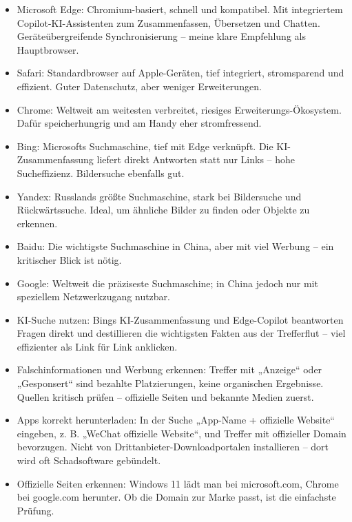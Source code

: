 
\begin{itemize}
  \item Microsoft Edge: Chromium-basiert, schnell und kompatibel. Mit integriertem Copilot-KI-Assistenten zum Zusammenfassen, Übersetzen und Chatten. Geräteübergreifende Synchronisierung – meine klare Empfehlung als Hauptbrowser.
  \item Safari: Standardbrowser auf Apple-Geräten, tief integriert, stromsparend und effizient. Guter Datenschutz, aber weniger Erweiterungen.
  \item Chrome: Weltweit am weitesten verbreitet, riesiges Erweiterungs-Ökosystem. Dafür speicherhungrig und am Handy eher stromfressend.
\end{itemize}


\begin{itemize}
  \item Bing: Microsofts Suchmaschine, tief mit Edge verknüpft. Die KI-Zusammenfassung liefert direkt Antworten statt nur Links – hohe Sucheffizienz. Bildersuche ebenfalls gut.
  \item Yandex: Russlands größte Suchmaschine, stark bei Bildersuche und Rückwärtssuche. Ideal, um ähnliche Bilder zu finden oder Objekte zu erkennen.
  \item Baidu: Die wichtigste Suchmaschine in China, aber mit viel Werbung – ein kritischer Blick ist nötig.
  \item Google: Weltweit die präziseste Suchmaschine; in China jedoch nur mit speziellem Netzwerkzugang nutzbar.
\end{itemize}


\begin{itemize}
  \item KI-Suche nutzen: Bings KI-Zusammenfassung und Edge-Copilot beantworten Fragen direkt und destillieren die wichtigsten Fakten aus der Trefferflut – viel effizienter als Link für Link anklicken.
  \item Falschinformationen und Werbung erkennen: Treffer mit „Anzeige“ oder „Gesponsert“ sind bezahlte Platzierungen, keine organischen Ergebnisse. Quellen kritisch prüfen – offizielle Seiten und bekannte Medien zuerst.
  \item Apps korrekt herunterladen: In der Suche „App-Name + offizielle Website“ eingeben, z. B. „WeChat offizielle Website“, und Treffer mit offizieller Domain bevorzugen. Nicht von Drittanbieter-Downloadportalen installieren – dort wird oft Schadsoftware gebündelt.
  \item Offizielle Seiten erkennen: Windows 11 lädt man bei microsoft.com, Chrome bei google.com herunter. Ob die Domain zur Marke passt, ist die einfachste Prüfung.
\end{itemize}

